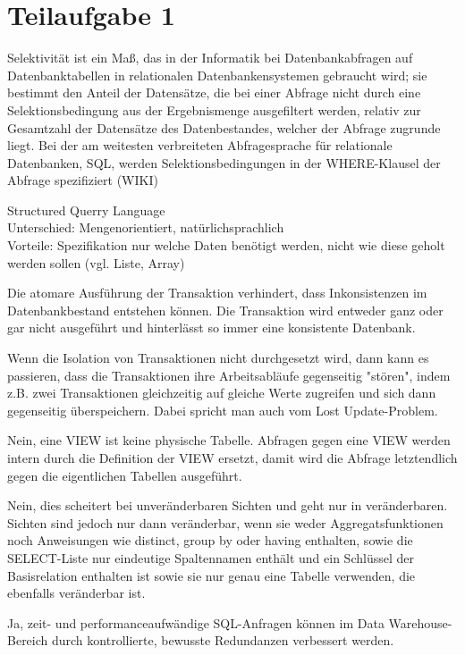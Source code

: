 \section{Teilaufgabe 1}
\begin{aufgabe}%
	\begin{teile}
		\item Selektivität ist ein Maß, das in der Informatik bei Datenbankabfragen auf Datenbanktabellen in relationalen Datenbankensystemen gebraucht wird; sie bestimmt den Anteil der Datensätze, die bei einer Abfrage nicht durch eine Selektionsbedingung aus der Ergebnismenge ausgefiltert werden, relativ zur Gesamtzahl der Datensätze des Datenbestandes, welcher der Abfrage zugrunde liegt. Bei der am weitesten verbreiteten Abfragesprache für relationale Datenbanken, SQL, werden Selektionsbedingungen in der WHERE-Klausel der Abfrage spezifiziert (WIKI)
		\item Structured Querry Language\\
		Unterschied: Mengenorientiert, nat\"urlichsprachlich\\
		Vorteile: Spezifikation nur welche Daten ben\"otigt werden, nicht wie diese geholt werden sollen (vgl. Liste, Array)
		\item Die atomare Ausführung der Transaktion verhindert, dass Inkonsistenzen im Datenbankbestand entstehen können. Die Transaktion wird entweder ganz oder gar nicht ausgeführt und hinterlässt so immer eine konsistente Datenbank. 
		\item Wenn die Isolation von Transaktionen nicht durchgesetzt wird, dann kann es passieren, dass die Transaktionen ihre Arbeitsabläufe gegenseitig "stören", indem z.B. zwei Transaktionen gleichzeitig auf gleiche Werte zugreifen und sich dann gegenseitig überspeichern. Dabei spricht man auch vom Lost Update-Problem. 
		\item Nein, eine VIEW ist keine physische Tabelle. Abfragen gegen eine VIEW werden intern durch die Definition der VIEW ersetzt, damit wird die Abfrage letztendlich gegen die eigentlichen Tabellen ausgeführt.
		\item Nein, dies scheitert bei unveränderbaren Sichten und geht nur in veränderbaren. Sichten sind jedoch nur dann veränderbar, wenn sie weder Aggregatsfunktionen noch Anweisungen wie distinct, group by oder having enthalten, sowie die SELECT-Liste nur eindeutige Spaltennamen enthält und ein Schlüssel der Basisrelation enthalten ist sowie sie nur genau eine Tabelle verwenden, die ebenfalls veränderbar ist.
		\item Ja, zeit- und performanceaufwändige SQL-Anfragen können im Data Warehouse-Bereich durch kontrollierte, bewusste Redundanzen verbessert werden. 
	\end{teile}
\end{aufgabe}


